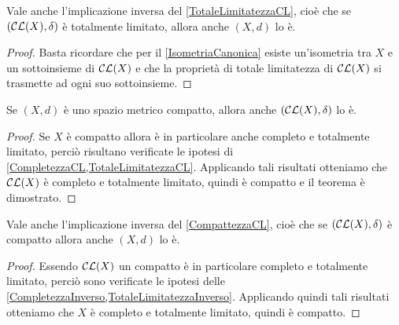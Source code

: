 \begin{remark}\label{TotaleLimitatezzaInverso}
	Vale anche l'implicazione inversa del \cref{TotaleLimitatezzaCL}, cioè che se  $(\mathcal{CL}(X),\delta)$ è totalmente limitato, allora anche $(X,d)$ lo è.
\end{remark}
\begin{proof}
	Basta ricordare che per il \cref{IsometriaCanonica} esiste un'isometria tra $X$ e un sottoinsieme di $\mathcal{CL}(X)$ e che la proprietà di totale limitatezza di $\mathcal{CL}(X)$ si trasmette ad ogni suo sottoinsieme.
\end{proof}



\begin{theorem} \label{CompattezzaCL}
	Se $(X,d)$ è uno spazio metrico compatto, allora anche $(\mathcal{CL}(X),\delta)$ lo è.
\end{theorem}
\begin{proof}
	Se $X$ è compatto allora è in particolare anche completo e totalmente limitato, perciò risultano verificate le ipotesi di \cref{CompletezzaCL,TotaleLimitatezzaCL}. Applicando tali risultati otteniamo che $\mathcal{CL}(X)$ è completo e totalmente limitato, quindi è compatto e il teorema è dimostrato.
\end{proof}

\begin{remark} \label{CompattezzaInverso}
	Vale anche l'implicazione inversa del \cref{CompattezzaCL}, cioè che se  $(\mathcal{CL}(X),\delta)$ è compatto allora anche $(X,d)$ lo è.
\end{remark}
\begin{proof}
	Essendo $\mathcal{CL}(X)$ un compatto è in particolare completo e totalmente limitato, perciò sono verificate le ipotesi delle \cref{CompletezzaInverso,TotaleLimitatezzaInverso}. Applicando quindi tali risultati otteniamo che $X$ è completo e totalmente limitato, quindi è compatto.
\end{proof}

